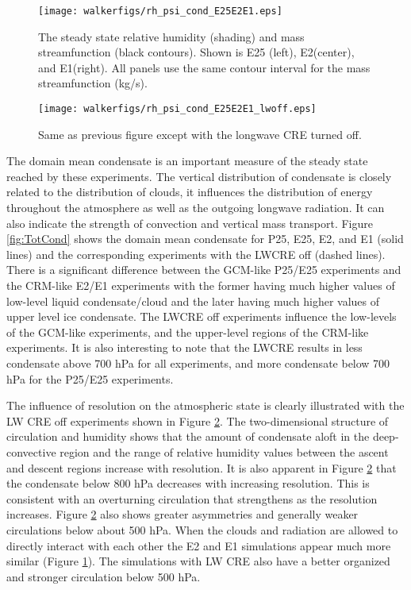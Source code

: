 \documentclass[11pt]{article}   	%
\begin{document}
\begin{figure}
  \centering
      \texttt{[image: walkerfigs/rh\_psi\_cond\_E25E2E1.eps]}
      \caption{The steady state relative humidity (shading) and mass streamfunction (black contours).  
      Shown is E25 (left), E2(center), and E1(right).  All panels use the same contour interval for the 
      mass streamfunction (kg/s).}
  \label{fig:rh_psi_P25E2E1}
\end{figure}

\begin{figure}
  \centering
      \texttt{[image: walkerfigs/rh\_psi\_cond\_E25E2E1\_lwoff.eps]}
          \caption{Same as previous figure except with the longwave CRE turned off.}
  \label{fig:rh_psi_P25E2E1_lwoff}
\end{figure}


The domain mean condensate is an important measure of the steady state reached by these experiments.  The vertical 
distribution of condensate is closely related to the distribution of clouds, it influences the distribution of energy throughout
the atmosphere as well as the outgoing longwave radiation.  It can also indicate the strength of convection 
and vertical mass transport.     Figure \ref{fig:TotCond} shows the domain mean condensate for P25, E25, E2, and E1
(solid lines) and the corresponding experiments with the LWCRE off (dashed lines).  There is a significant difference 
between the GCM-like P25/E25 experiments and the CRM-like E2/E1 experiments with the former having much 
higher values of low-level liquid condensate/cloud and the later having much higher values of upper level ice 
condensate.  The LWCRE off experiments influence the low-levels of the GCM-like experiments, and the upper-level
regions of the CRM-like experiments.     It is also interesting to note that the LWCRE results in less condensate 
above 700 hPa for all experiments, and more condensate below 700 hPa for the P25/E25 experiments.  

The influence of resolution on the atmospheric state is clearly illustrated with the LW CRE off experiments shown 
in Figure \ref{fig:rh_psi_P25E2E1_lwoff}.
The two-dimensional structure of circulation and humidity shows that the amount of condensate aloft in the 
deep-convective region and the range of relative
humidity values between the ascent and descent regions increase with resolution.  It is also apparent in Figure
\ref{fig:rh_psi_P25E2E1_lwoff} that the condensate below 800 hPa decreases with increasing resolution.  
This is consistent with an overturning circulation that 
strengthens as the resolution increases.  Figure \ref{fig:rh_psi_P25E2E1_lwoff} also shows greater asymmetries 
and generally weaker circulations below about 500 hPa.  
When the clouds and radiation are allowed to directly interact with each other the E2 and E1 simulations 
appear much more similar (Figure \ref{fig:rh_psi_P25E2E1}).  The simulations with LW CRE also have a better
organized and stronger circulation below 500 hPa.     
\end{document}
